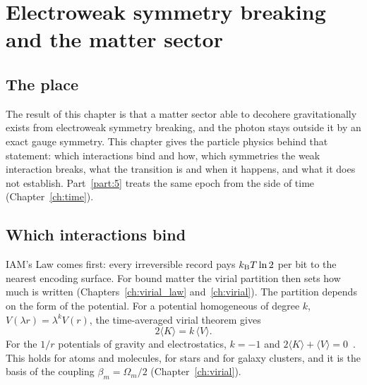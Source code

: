 \chapter{Electroweak symmetry breaking and the matter sector}\label{ch:electroweak}

\section*{The place}
The result of this chapter is that a matter sector able to decohere gravitationally exists from electroweak symmetry breaking, and the
photon stays outside it by an exact gauge symmetry. This chapter gives the particle physics behind that statement: which interactions bind and how,
which symmetries the weak interaction breaks, what the transition is and when it happens, and what it does not establish. Part~\ref{part:5} treats the same
epoch from the side of time (Chapter~\ref{ch:time}).

\section{Which interactions bind}\label{sec:ew:bind}
IAM's Law comes first: every irreversible record pays $k_{\mathrm B} T\ln2$ per bit to the nearest encoding surface. For bound matter the virial partition then
sets how much is written (Chapters~\ref{ch:virial_law} and~\ref{ch:virial}). The partition depends on the form of the potential. For a potential
homogeneous of degree $k$, $V(\lambda r)=\lambda^kV(r)$, the time-averaged virial theorem gives~\cite{Clausius1870}
\begin{equation}
2\langle K\rangle=k\,\langle V\rangle.\label{eq:ew:virial}
\end{equation}
\derived{} For the $1/r$ potentials of gravity and electrostatics, $k=-1$ and $2\langle K\rangle+\langle V\rangle=0$~\cite{Clausius1870}. This holds for atoms and
molecules, for stars and for galaxy clusters, and it is the basis of the coupling $\beta_m=\Omega_m/2$ (Chapter~\ref{ch:virial}).

